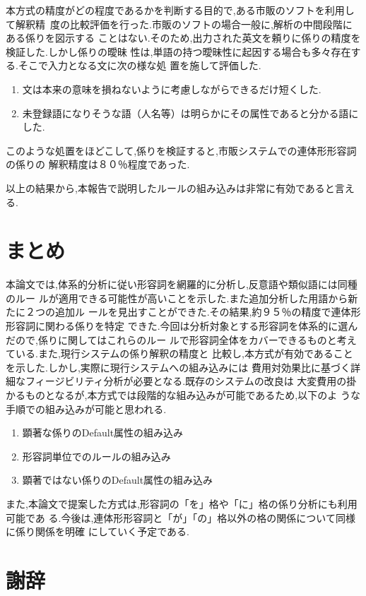 本方式の精度がどの程度であるかを判断する目的で,ある市販のソフトを利用して\mbox{解釈精
度の}比較評価を行った.市販のソフトの場合一般に,解析の中間段階にある係りを図示する
ことはない.そのため,出力された英文を頼りに係りの精度を検証した.しかし係りの曖昧
性は,単語の持つ曖昧性に起因する場合も多々存在する.そこで入力となる文に次の様な処
置を施して評価した.
\begin{enumerate}
\item 文は本来の意味を損ねないように考慮しながらできるだけ短くした.
\item 未登録語になりそうな語（人名等）は明らかにその属性であると分かる語にした.
\end{enumerate}
このような処置をほどこして,係りを検証すると,市販システムでの連体形形容詞の係りの
解釈精度は８０％程度であった.

以上の結果から,本報告で説明したルールの組み込みは非常に有効であると言える.


\section{まとめ}

本論文では,体系的分析に従い形容詞を網羅的に分析し,反意語や類似語には同種のルー
ルが適用できる可能性が高いことを示した.また追加分析した用語から新たに２つの追加ル
ールを見出すことができた.その結果,約９５％の精度で連体形形容詞に関わる係りを特定
できた.今回は分析対象とする形容詞を体系的に選んだので,係りに関してはこれらのルー
ルで形容詞全体をカバーできるものと考えている.また,現行システムの係り解釈の精度と
比較し,本方式が有効であることを示した.しかし,実際に現行システムへの組み込みには
費用対効果比に基づく詳細なフィージビリティ分析が必要となる.既存のシステムの改良は
大変費用の掛かるものとなるが,本方式では段階的な組み込みが可能であるため,以下のよ
うな手順での組み込みが可能と思われる.
\begin{enumerate}
\item 顕著な係りのDefault属性の組み込み
\item 形容詞単位でのルールの組み込み
\item 顕著ではない係りのDefault属性の組み込み
\end{enumerate}
また,本論文で提案した方式は,形容詞の「を」格や「に」格の係り分析にも利用可能であ
る.今後は,連体形形容詞と「が」「の」格以外の格の関係について同様に係り関係を明確
にしていく予定である.


\section*{謝辞}

